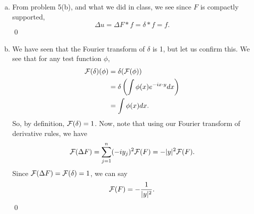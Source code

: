 \documentclass{article}
\begin{document}
\newpage
{} 
 \tri
\hop 
\solution
\begin{enumerate}[(a)]
    \item From problem 5(b), and what we did in class, we see since $F$ is compactly supported,
    \[\Delta u = \Delta F * f = \delta * f  = f.\]
    \qed
    \item We have seen that the Fourier transform of $\delta$ is 1, but let us confirm this. We see that for any test function $\phi$, 
    \begin{align*}
        \F(\delta)(\phi) &= \delta(\F(\phi)) \\
        &= \delta\del{\int \phi(x)e^{-ix\cdot y}dx}\\
        &= \int \phi(x)dx.
    \end{align*}
    So, by definition, $\mathcal{F}(\delta) = 1$.
    \hop 
    Now, note that using our Fourier transform of derivative rules, we have 
    \[\mathcal{F}(\Delta F) = \sum_{j=1}^n (-iy_j)^2 \mathcal{F}(F) = -|y|^2\mathcal{F}(F).\]
    Since $\mathcal{F}(\Delta F) = \mathcal{F}(\delta) = 1$, we can say 
    \[\mathcal{F}(F) = -\frac{1}{|y|^2}.\]
    \qed
\end{enumerate}
\end{document}
